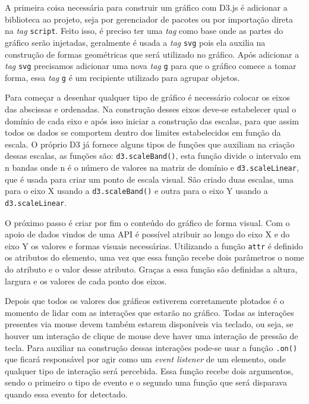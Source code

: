 A primeira coisa necessária para construir um gráfico com D3.js é adicionar a biblioteca ao projeto, seja por gerenciador de pacotes ou por importação direta na \textit{tag} \lstinline{script}. Feito isso, é preciso ter uma \textit{tag} como base onde as partes do gráfico serão injetadas, geralmente é usada a \textit{tag} \lstinline{svg} pois ela auxilia na construção de formas geométricas que será utilizado no gráfico. Após adicionar a \textit{tag} \lstinline{svg} precisamos adicionar uma nova \textit{tag} \lstinline{g} para que o gráfico comece a tomar forma, essa \textit{tag} \lstinline{g} é um recipiente utilizado para agrupar objetos.

Para começar a desenhar qualquer tipo de gráfico é necessário colocar os eixos das abscissas e ordenadas. Na construção desses eixos deve-se estabelecer qual o domínio de cada eixo e após isso iniciar a construção das escalas, para que assim todos os dados se comportem dentro dos limites estabelecidos em função da escala. O próprio D3  já fornece alguns tipos de funções que auxiliam na criação dessas escalas, as funções são: \lstinline{d3.scaleBand()}, esta função divide o intervalo em n bandas onde n é o número de valores na matriz de domínio e \lstinline{d3.scaleLinear}, que é usada para criar um ponto de escala visual. São criado duas escalas, uma para o eixo X usando a \lstinline{d3.scaleBand()} e outra para o eixo Y usando a \lstinline{d3.scaleLinear}.

O próximo passo é criar por fim o conteúdo do gráfico de forma visual. Com o apoio de dados vindos de uma API é possível atribuir ao longo do eixo X e do eixo Y os valores e formas visuais necessárias. Utilizando a função \lstinline{attr} é definido os atributos do elemento, uma vez que essa função recebe dois parâmetros o nome do atributo e o valor desse atributo. Graças a essa função são definidas a altura, largura e os valores de cada ponto dos eixos.

Depois que todos os valores dos gráficos estiverem corretamente plotados é o momento de lidar com as interações que estarão no gráfico. Todas as interações presentes via mouse devem também estarem disponíveis via teclado, ou seja, se houver um interação de clique de mouse deve haver uma interação de pressão de tecla. Para auxiliar na construção dessas interações pode-se usar a função \lstinline{.on()} que ficará responsável por agir como um \textit{event listener} de um elemento, onde qualquer tipo de interação será percebida. Essa função recebe dois argumentos, sendo o primeiro o tipo de evento e o segundo uma função que será disparava quando essa evento for detectado. 

